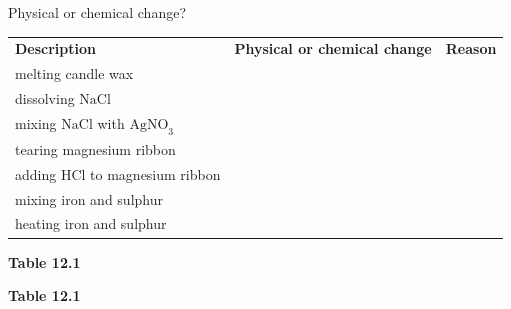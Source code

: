\begin{Investigation}{Physical or chemical change? }
          \begin{table}[H]
        \begin{center}
      \label{m38709*id63990}
    \noindent
      \tablelasttail{}
      \begin{xtabular}[t]{|l|l|l|}\hline
                  \textbf{Description}
                 &
                  \textbf{Physical or chemical change}
                 &
                  \textbf{Reason}
     \tabularnewline{}
        melting candle wax &
         &
     \tabularnewline{}
        dissolving $\mathrm{NaCl}$ &
         &
     \tabularnewline{}
        mixing $\mathrm{NaCl}$ with ${\mathrm{AgNO}}_{3}$ &
         &
     \tabularnewline{}
        tearing magnesium ribbon &
         &
     \tabularnewline{}
        adding $\mathrm{HCl}$ to magnesium ribbon &
         &
     \tabularnewline{}
        mixing iron and sulphur &
         &
     \tabularnewline{}
        heating iron and sulphur &
         &
     \tabularnewline{}
    \end{xtabular}
      \end{center}
    \begin{center}{\small\bfseries Table 12.1}\end{center}
    \begin{caption}{\small\bfseries Table 12.1}\end{caption}
\end{table}
    \par
  \par 
\end{Investigation}
    \label{m38711*cid4}
